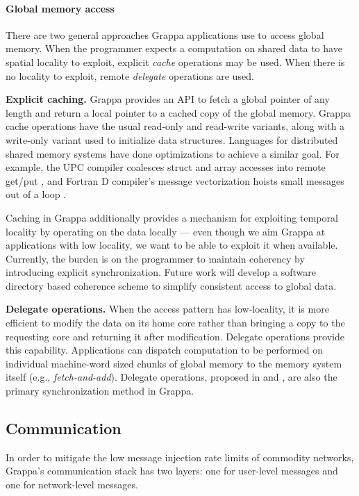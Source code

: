 \paragraph{Global memory access} There are two general approaches Grappa applications use to {\emph access} global memory. When the programmer expects a computation on shared data to have spatial locality to exploit, explicit {\em cache} operations may be used. When there is no locality to exploit, remote {\em delegate} operations are used.

\textbf{Explicit caching.} Grappa provides an API to fetch a global pointer of any length and return a local pointer to a cached copy of the global memory.  Grappa cache operations have the usual read-only and read-write variants, along with a write-only variant used to initialize data structures. Languages for distributed shared memory systems have done optimizations to achieve a similar goal. For example, the UPC compiler coalesces struct and array accesses into remote get/put \cite{Chen:2005}, and Fortran D compiler's message vectorization hoists small messages out of a loop \cite{FortranD:1992}. 

Caching in Grappa additionally provides a mechanism for exploiting temporal locality by operating on the data locally --- even though we aim Grappa at applications with low locality, we want to be able to exploit it when available. 
Currently, the burden is on the programmer to maintain coherency by introducing explicit synchronization.  Future work will develop a software directory based coherence scheme to simplify consistent access to global data.

\textbf{Delegate operations.} When the access pattern has low-locality, it is more efficient to modify the data on its home core rather than bringing a copy to the requesting core and returning it after modification. Delegate operations provide this capability. Applications can dispatch computation to be performed on individual machine-word sized chunks of global memory to the memory system itself (e.g., \emph{fetch-and-add}).  Delegate operations, proposed in \cite{Nelson:hotpar11} and \cite{delegated:oopsla11}, are also the primary synchronization method in Grappa.

\subsection{Communication}
\label{sec:communication}

In order to mitigate the low message injection rate limits of commodity networks, Grappa's communication stack has two layers: one for user-level messages and one for network-level messages.

